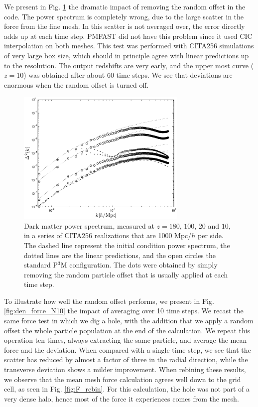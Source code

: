 We present in Fig. \ref{fig:disp_mesh} the dramatic impact of removing the random offset in the code.
The power spectrum is completely wrong, due to the large scatter in the force from the fine mesh.
In this scatter is not averaged over, the error directly adds up at each time step. {\small PMFAST}
did not have this problem since it used CIC interpolation on both meshes.  
This test was performed with CITA256 simulations of very large box size,
which should in principle agree with linear predictions up to the resolution.
The output redshifts are very early, and the upper most curve ($z=10$) was obtained after
about 60 time steps.
We see that deviations are enormous when the random offset is turned off.

\begin{figure}%
  \begin{center}
    \includegraphics[width=3.2in]{graphs/power_w_wo_disp_mesh.eps}
  \caption{Dark matter power spectrum, measured at $z=180$, $100$, $20$ and $10$, in a series of CITA256 realizations that are 1000 Mpc/$h$ per side. The dashed line represent the initial condition power spectrum, the dotted lines are the linear predictions, and  the open circles the standard P$^3$M configuration. 
  The dots were obtained by simply removing the random particle offset that is usually applied at each time step. \label{fig:disp_mesh}}
\end{center}
\end{figure}

To illustrate how well the random offset performs, we present in Fig. \ref{fig:den_force_N10}
the impact of averaging over 10 time steps. We recast the same force test in which we dig a hole, 
with the addition that we apply a random offset the whole particle population at the end of the calculation.
We repeat this operation ten times, always extracting the same particle, and average the mean force and the deviation.
When compared with a single time step, we see that the scatter has reduced by almost a factor of three in the radial direction, 
while the transverse deviation shows a milder improvement. When rebining these results, we observe that the mean mesh force
calculation agrees well down to the grid cell, as seen in Fig. \ref{fig:F_rebin}. For this calculation, the hole was not part of a very dense halo,
hence most of the force it experiences comes from the mesh.


